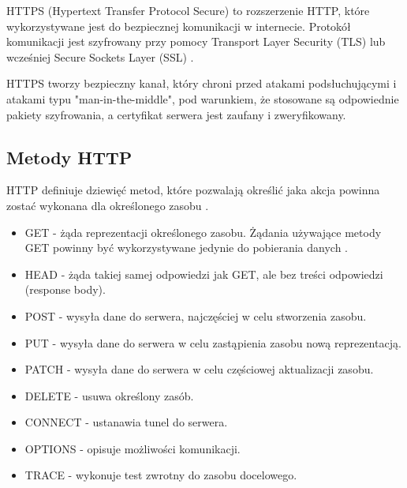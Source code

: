		HTTPS (Hypertext Transfer Protocol Secure) to rozszerzenie HTTP, które wykorzystywane jest do bezpiecznej komunikacji w internecie. Protokół komunikacji jest szyfrowany przy pomocy Transport Layer Security (TLS) lub wcześniej Secure Sockets Layer (SSL) \cite{WikipediaHTTPS}.
		
		HTTPS tworzy bezpieczny kanał, który chroni przed atakami podsłuchującymi i atakami typu "man-in-the-middle", pod warunkiem, że stosowane są odpowiednie pakiety szyfrowania, a certyfikat serwera jest zaufany i zweryfikowany.
	
	\subsection{Metody HTTP}
		HTTP definiuje dziewięć metod, które pozwalają określić jaka akcja powinna zostać wykonana dla określonego zasobu \cite{MozillaHTTPMethods}.
		
		\begin{itemize}
			\item GET - żąda reprezentacji określonego zasobu. Żądania używające metody GET powinny być wykorzystywane jedynie do pobierania danych \cite{RESTfulWebServices}.
			\item HEAD - żąda takiej samej odpowiedzi jak GET, ale bez treści odpowiedzi (response body).
			\item POST - wysyła dane do serwera, najczęściej w celu stworzenia zasobu.
			\item PUT - wysyła dane do serwera w celu zastąpienia zasobu nową reprezentacją.
			\item PATCH - wysyła dane do serwera w celu częściowej aktualizacji zasobu.
			\item DELETE - usuwa określony zasób.
			\item CONNECT - ustanawia tunel do serwera.
			\item OPTIONS - opisuje możliwości komunikacji.
			\item TRACE - wykonuje test zwrotny do zasobu docelowego.
		\end{itemize}
		
